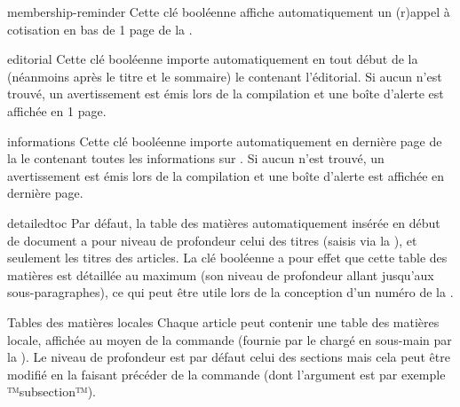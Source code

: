 \documentclass{letgut}
\begin{document}
\begin{docKey}{membership-reminder}{}{}
  Cette clé booléenne affiche automatiquement un (r)appel à cotisation en bas de
  1\iere{} page de la .
\end{docKey}

\begin{docKey}{editorial}{}{}
  Cette clé booléenne importe automatiquement en tout début de la 
  (néanmoins après le titre et le sommaire) le  contenant
  l'éditorial. Si aucun  n'est trouvé, un avertissement est
  émis lors de la compilation et une boîte d'alerte est affichée en 1\iere{}
  page.
\end{docKey}

\begin{docKey}{informations}{}{}
  Cette clé booléenne importe automatiquement en dernière page de la 
  le  contenant toutes les informations sur
  \gut{}. Si aucun  n'est trouvé, un avertissement
  est émis lors de la compilation et une boîte d'alerte est affichée en dernière
  page.
\end{docKey}

\begin{docKey}{detailedtoc}{}{}
  Par défaut, la table des matières automatiquement insérée en début de document
  a pour niveau de profondeur celui des titres (saisis via la ),
  et seulement les titres des articles. La clé booléenne 
  a pour effet que cette table des matières est détaillée au maximum (son niveau
  de profondeur allant jusqu'aux sous-paragraphes), ce qui peut être utile lors
  de la conception d'un numéro de la .

  \begin{dbremark}{Tables des matières locales}{}
    Chaque article peut contenir une table des matières locale, affichée au
    moyen de la commande  (fournie par le
     chargé en sous-main par la ). Le niveau de
    profondeur est par défaut celui des sections mais cela peut être modifié en
    la faisant précéder de la commande  (dont
    l'argument est par exemple ™subsection™).
  \end{dbremark}
\end{docKey}
\end{document}

